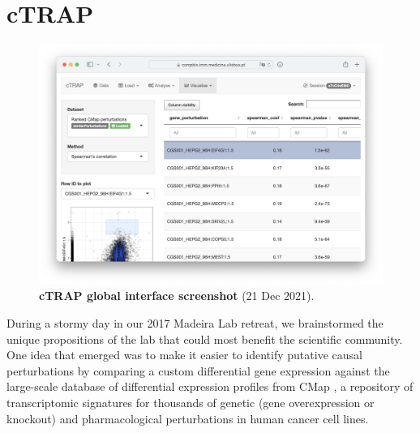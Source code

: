 
\chapter{cTRAP}
\label{chap:ctrap}

\begin{figure}[!b]
  \vspace*{-1cm}
  \includegraphics[width=.96\textwidth]{images/cTRAP/screenshot}
  \centering
  \vspace*{-.5cm}
  \caption[cTRAP global interface screenshot]{\textbf{cTRAP global interface screenshot} (21 Dec 2021).}
  \label{fig:cTRAP-screenshot}
\end{figure}

During a stormy day in our 2017 Madeira Lab retreat, we brainstormed the unique propositions of the lab that could most benefit the scientific community. One idea that emerged was to make it easier to identify putative causal perturbations by comparing a custom differential gene expression against the large-scale database of differential expression profiles from CMap \cite{subramanian:2017ul}, a repository of transcriptomic signatures for thousands of genetic (gene overexpression or knockout) and pharmacological perturbations in human cancer cell lines. %

